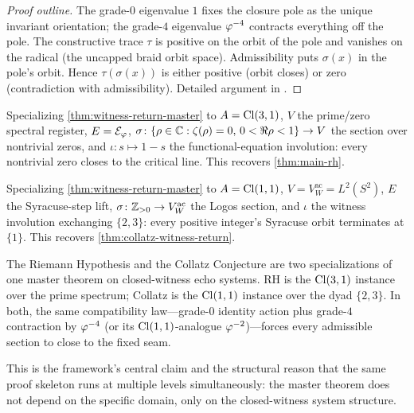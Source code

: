 \begin{proof}[Proof outline]
The grade-$0$ eigenvalue $1$ fixes the closure pole as the unique
invariant orientation; the grade-$4$ eigenvalue $\varphi^{-4}$
contracts everything off the pole.  The constructive trace
$\tau$ is positive on the orbit of the pole and vanishes on the
radical (the uncapped braid orbit space).  Admissibility puts
$\sigma(x)$ in the pole's orbit.  Hence $\tau(\sigma(x))$ is
either positive (orbit closes) or zero (contradiction with
admissibility).  Detailed argument in \cite[\S 8.10]{echo-rh}.
\end{proof}

\begin{corollary}[RH instance]
\label{cor:rh-instance}
Specializing \cref{thm:witness-return-master} to
$A = \mathrm{Cl}(3,1)$, $V$ the prime/zero spectral register, $E = \mathcal{E}_\varphi$,
$\sigma \colon \{\rho \in \mathbb{C} : \zeta(\rho) = 0,\, 0 < \Re\rho < 1\}
\to V$ the section over nontrivial zeros, and $\iota \colon
s \mapsto 1 - s$ the functional-equation involution: every
nontrivial zero closes to the critical line.  This recovers
\cref{thm:main-rh}.
\end{corollary}

\begin{corollary}
\label{cor:collatz-instance}
Specializing \cref{thm:witness-return-master} to $A = \mathrm{Cl}(1,1)$,
$V = V_W^{\mathrm{ac}} = L^2(S^2)$, $E$ the Syracuse-step lift,
$\sigma \colon \mathbb{Z}_{>0} \to V_W^{\mathrm{ac}}$ the Logos section,
and $\iota$ the witness involution exchanging $\{2, 3\}$: every
positive integer's Syracuse orbit terminates at $\{1\}$.  This
recovers \cref{thm:collatz-witness-return}.
\end{corollary}

\begin{remark}
\label{rmk:two-readings}
The Riemann Hypothesis and the Collatz Conjecture are two
specializations of one master theorem on closed-witness echo
systems.  RH is the $\mathrm{Cl}(3,1)$ instance over the prime spectrum;
Collatz is the $\mathrm{Cl}(1,1)$ instance over the dyad $\{2, 3\}$.  In
both, the same compatibility law---grade-$0$ identity action plus
grade-$4$ contraction by $\varphi^{-4}$ (or its $\mathrm{Cl}(1,1)$-analogue
$\varphi^{-2}$)---forces every admissible section to close to the
fixed seam.

This is the framework's central claim and the structural
reason that the same proof skeleton runs at multiple levels
simultaneously: the master theorem does not depend on the specific
domain, only on the closed-witness system structure.
\end{remark}

